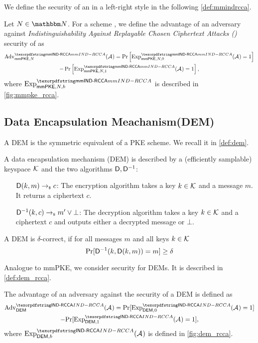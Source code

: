 We define the security of an \mmPKE in a left-right style in the following \cref{def:mmindrcca}.

\begin{definition}[\mmindrcca]\label{def:mmindrcca}
Let $N\in\N$. For a scheme \mmPKE, we define the advantage of an adversary \Adv against \emph{Indistinguishability Against Replayable Chosen Ciphertext Attacks (\mmindrcca)} security of \mmPKE as
\begin{multline*}
  \adv{\mmindrcca}{\mmPKE, \nUsers}(\Adv) = \Pr\left[\Exp^{\mmindrcca}_{\mmPKE,\nUsers, 0}(\Adv) = 1\right] \\ -
      \Pr\left[\Exp^{\mmindrcca}_{\mmPKE,\nUsers,1}(\Adv) = 1\right],
\end{multline*}
where $\textnormal{Exp}^{\mmindrcca}_{\mmPKE,N,b}$ is described in \cref{fig:mmpke_rcca}.
\end{definition}


\subsection{Data Encapsulation Meachanism(DEM)}
A DEM is the symmetric equivalent of a PKE scheme. We recall it in \cref{def:dem}.

\begin{definition}[DEM]\label{def:dem}
  A data encapsulation mechanism (DEM) \dem is described by a (efficiently samplable) keyspace $\mathcal{K}$ and the two
  algorithms ${\mathsf{D}}, {\mathsf{D}}^{-1}$:
  \begin{itemize}[align=left]
    \item[${\mathsf{D}}(k, m)\rightarrow_{\scriptscriptstyle\$} c$:] The encryption algorithm takes a key $k\in\mathcal{K}$ and a message $m$. It returns a ciphertext $c$.
    \item[${\mathsf{D}}^{-1}(k, c) \rightarrow_{\scriptscriptstyle\$} m'\lor\bot$:] The decryption algorithm takes a key $k\in\mathcal{K}$ and a
      ciphertext $c$ and outputs either a decrypted message or $\bot$.
    \end{itemize}
    A DEM \dem is $\delta$-correct, if for all messages $m$ and all keys $k\in\mathcal{K}$
    \[
      \text{Pr}[{\mathsf{D}}^{-1}(k, {\mathsf{D}}(k,m)) = m] \geq \delta
    \]
  \end{definition}

  Analogue to mmPKE, we consider \indrcca security for DEMs. It is described in \cref{def:dem_rcca}.

  \begin{definition}\label{def:dem_rcca}
    The advantage of an adversary \Adv against the \indrcca security of a DEM \dem is defined as
    \begin{multline*}
      \adv{\indrcca}{\dem}(\Adv) = \text{Pr}[\experiment{\indrcca}{\dem, 0}(\Adv) = 1] \\-
      \text{Pr}[\experiment{\indrcca}{\dem, 1}(\Adv) = 1],
    \end{multline*}
    where $\experiment{\indrcca}{\dem, b}(\Adv)$ is defined in \cref{fig:dem_rcca}.
  \end{definition}

